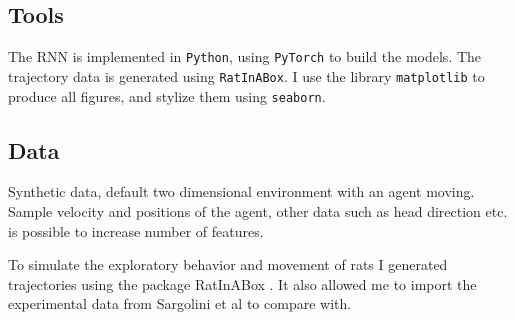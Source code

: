 
\subsection{Tools}\label{sssec:tools}
The RNN is implemented in \verb|Python|, using \verb|PyTorch| to build the models. The trajectory data is generated using \verb|RatInABox|. I use the library \verb|matplotlib| to produce all figures, and stylize them using \verb|seaborn|. 

\subsection{Data}\label{sssec:data}
Synthetic data, default two dimensional environment with an agent moving. Sample velocity and positions of the agent, other data such as head direction etc. is possible to increase number of features.

To simulate the exploratory behavior and movement of rats I generated trajectories using the package RatInABox \cite{george:2022:ratinabox}. It also allowed me to import the experimental data from Sargolini et al \cite{sargolini:2006:conjunctive} to compare with.



